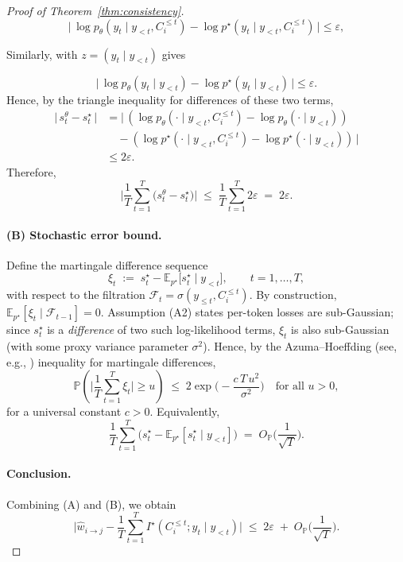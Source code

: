 \documentclass{article} %
\theoremstyle{definition}
\newcommand{\EE}{\mathbb{E}}
\newcommand{\PP}{\mathbb{P}}
\begin{document}
\begin{proof}[Proof of Theorem~\ref{thm:consistency}]
\[
\big|\,\log p_\theta(y_t\mid y_{<t},C_i^{\le t}) - \log p^\star(y_t\mid y_{<t},C_i^{\le t})\,\big|\le \varepsilon,
\]

Similarly, with $z=(y_t\mid y_{<t})$ gives

\[
\big|\,\log p_\theta(y_t\mid y_{<t}) - \log p^\star(y_t\mid y_{<t})\,\big|\le \varepsilon.
\]
Hence, by the triangle inequality for differences of these two terms,
\begin{align*}
\big|\,s_t^\theta - s_t^\star\,\big|
&= \big|\,(\log p_\theta(\cdot\mid y_{<t},C_i^{\le t})
      - \log p_\theta(\cdot\mid y_{<t})) \nonumber\\
&\quad - (\log p^\star(\cdot\mid y_{<t},C_i^{\le t})
      - \log p^\star(\cdot\mid y_{<t}))\,\big| \nonumber\\
&\le 2\varepsilon.
\end{align*}
Therefore,
\[
\bigg|\frac{1}{T}\sum_{t=1}^{T} \big(s_t^\theta - s_t^\star\big)\bigg|
\;\le\; \frac{1}{T}\sum_{t=1}^{T} 2\varepsilon \;=\; 2\varepsilon.
\]

\paragraph{(B) Stochastic error bound.}
Define the martingale difference sequence
\[
\xi_t \;:=\; s_t^\star - \EE_{p^\star}\!\big[ s_t^\star \mid y_{<t}\big],
\qquad t=1,\dots,T,
\]
with respect to the filtration $\mathcal{F}_t=\sigma(y_{\le t},C_i^{\le t})$.
By construction, $\EE_{p^\star}[\xi_t\mid \mathcal{F}_{t-1}]=0$.
Assumption (A2) states per-token losses are sub-Gaussian; since $s_t^\star$ is a \emph{difference} of two such log-likelihood terms, $\xi_t$ is also sub-Gaussian (with some proxy variance parameter $\sigma^2$). Hence, by the Azuma--Hoeffding (see, e.g., \citet{boucheron2013concentration}) inequality for martingale differences,
\[
\PP\!\left(\bigg|\frac{1}{T}\sum_{t=1}^{T} \xi_t\bigg| \ge u\right)
\;\le\; 2\exp\!\Big(\!-\frac{c\,T\,u^2}{\sigma^2}\Big)
\quad\text{for all }u>0,
\]
for a universal constant $c>0$.
Equivalently,
\[
\frac{1}{T}\sum_{t=1}^{T} \big(s_t^\star - \EE_{p^\star}[ s_t^\star \mid y_{<t}]\big)
\;=\; O_\PP\!\Big(\frac{1}{\sqrt{T}}\Big).
\]

\paragraph{Conclusion.}
Combining (A) and (B), we obtain
\[
\bigg|\hat{w}_{i\to j} - \frac{1}{T}\sum_{t=1}^{T} I^\star(C_i^{\le t};y_t\mid y_{<t})\bigg|
\;\le\; 2\varepsilon \;+\; O_\PP\!\Big(\frac{1}{\sqrt{T}}\Big).
\]
\end{proof}
\end{document}
